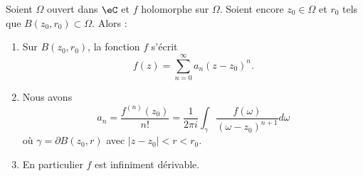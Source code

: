 \begin{theorem}     \label{ThomcPOdd}  
    Soient \( \Omega\) ouvert dans \( \eC\) et \( f\) holomorphe sur \( \Omega\). Soient encore \( z_0\in \Omega\) et \( r_0\) tels que \( B(z_0,r_0)\subset \Omega\). Alors :
    \begin{enumerate}
        \item       \label{ITEMooYWSOooHJtxGr}
            Sur \( B(z_0,r_0)\), la fonction \( f\) s'écrit
    \begin{equation}
        f(z)=\sum_{n=0}^{\infty}a_n(z-z_0)^n.
    \end{equation}
    \item
        Nous avons
        \begin{equation}
            a_n=\frac{ f^{(n)}(z_0) }{ n! }=\frac{1}{ 2\pi i }\int_{\gamma}\frac{ f(\omega) }{ (\omega-z_0)^{n+1} }d\omega
        \end{equation}
        où \( \gamma=\partial B(z_0,r)\) avec \( | z-z_0 |<r<r_0\).
    \item   \label{ItemMRRTooMChmuZ}
        En particulier \( f\) est infiniment dérivable.
    \end{enumerate}
\end{theorem}

